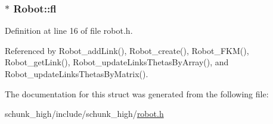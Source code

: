 \hypertarget{structRobot_aa983a42f95f55c494fd4154c4d42be47}{
\subsubsection[{fl}]{$\ast$ Robot\-::fl}}\label{structRobot_aa983a42f95f55c494fd4154c4d42be47}


Definition at line 16 of file robot.\-h.



Referenced by Robot\-\_\-add\-Link(), Robot\-\_\-create(), Robot\-\_\-\-F\-K\-M(), Robot\-\_\-get\-Link(), Robot\-\_\-update\-Links\-Thetas\-By\-Array(), and Robot\-\_\-update\-Links\-Thetas\-By\-Matrix().



The documentation for this struct was generated from the following file\-:\begin{DoxyCompactItemize}
\item 
schunk\-\_\-high/include/schunk\-\_\-high/\hyperlink{robot_8h}{robot.\-h}\end{DoxyCompactItemize}
